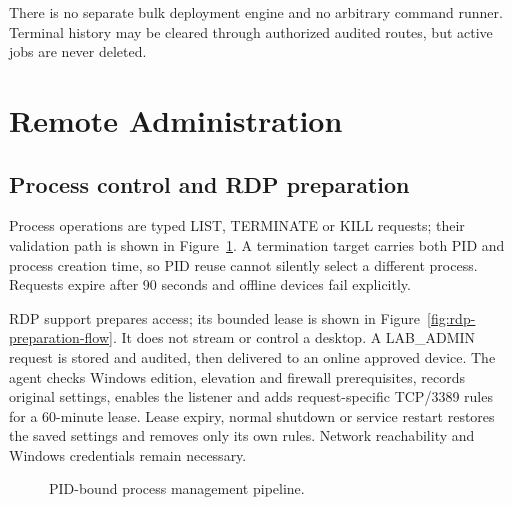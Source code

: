 \documentclass[12pt,a4paper]{report}
\begin{document}
There is no separate bulk deployment engine and no arbitrary command runner.
Terminal history may be cleared through authorized audited routes, but active
jobs are never deleted.

\section{Remote Administration}

\subsection{Process control and RDP preparation}
Process operations are typed LIST, TERMINATE or KILL requests; their
validation path is shown in Figure~\ref{fig:process-management-flow}. A
termination target carries both PID and process creation time, so PID reuse cannot silently
select a different process. Requests expire after 90 seconds and offline
devices fail explicitly.

RDP support prepares access; its bounded lease is shown in
Figure~\ref{fig:rdp-preparation-flow}. It does not stream or control a desktop. A
LAB\_ADMIN request is stored and audited, then delivered to an online approved
device. The agent checks Windows edition, elevation and firewall prerequisites,
records original settings, enables the listener and adds request-specific
TCP/3389 rules for a 60-minute lease. Lease expiry, normal shutdown or service
restart restores the saved settings and removes only its own rules. Network
reachability and Windows credentials remain necessary.

\begin{figure}[H]
\centering
{}
\caption{PID-bound process management pipeline.}
\label{fig:process-management-flow}
\end{figure}
\end{document}
